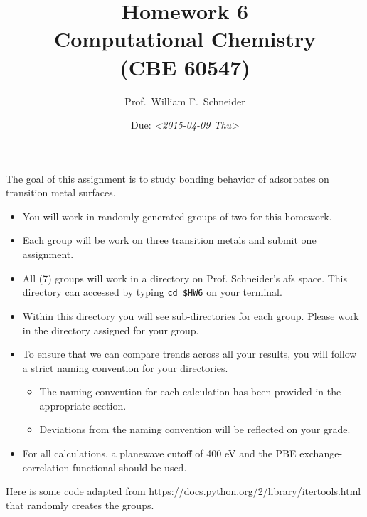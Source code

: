 \documentclass[11pt]{article}
\date{Due: \textit{<2015-04-09 Thu>}}
\title{}
\begin{document}
\title{Homework 6\\Computational Chemistry\\(CBE 60547)}
\author{Prof.\ William F.\ Schneider}
\maketitle

The goal of this assignment is to study bonding behavior of adsorbates on transition metal surfaces.

\begin{itemize}
\item You will work in randomly generated groups of two for this homework.

\item Each group will be work on three transition metals and submit one assignment.

\item All (7) groups will work in a directory on Prof. Schneider's afs space. This directory can accessed by typing \verb~cd $HW6~ on your terminal.

\item Within this directory you will see sub-directories for each group. Please work in the directory assigned for your group.

\item To ensure that we can compare trends across all your results, you will follow a strict naming convention for your directories. 
\begin{itemize}
\item The naming convention for each calculation has been provided in the appropriate section.
\item Deviations from the naming convention will be reflected on your grade.
\end{itemize}

\item For all calculations, a planewave cutoff of 400 eV and the PBE exchange-correlation functional should be used.
\end{itemize}

Here is some code adapted from \url{https://docs.python.org/2/library/itertools.html} that randomly creates the groups.
\end{document}
